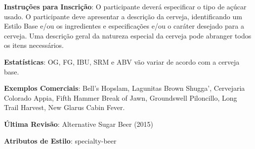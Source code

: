 \textbf{Instruções para Inscrição}: O participante deverá especificar o tipo de açúcar usado. O participante deve apresentar a descrição da cerveja, identificando um Estilo Base e/ou os ingredientes e especificações e/ou o caráter desejado para a cerveja. Uma descrição geral da natureza especial da cerveja pode abranger todos os itens necessários.

\textbf{Estatísticas}: OG, FG, IBU, SRM e ABV vão variar de acordo com a cerveja base.

\textbf{Exemplos Comerciais}: Bell’s Hopslam, Lagunitas Brown Shugga’, Cervejaria Colorado Appia, Fifth Hammer Break of Jawn, Groundswell Piloncillo, Long Trail Harvest, New Glarus Cabin Fever.

\textbf{Última Revisão}: Alternative Sugar Beer (2015)

\textbf{Atributos de Estilo}: specialty-beer
